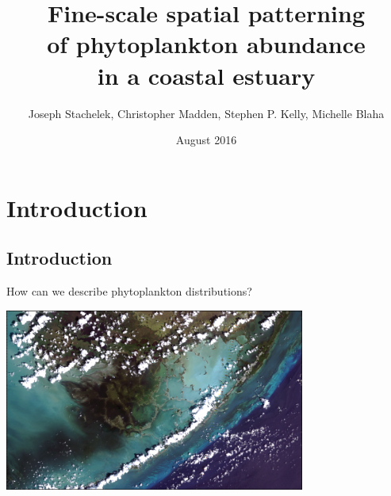 \documentclass[compress,noflama,nosectionpages]{beamer}
\title{\nohyphens{Fine-scale spatial patterning \protect\\ of phytoplankton abundance \protect\\ in a coastal estuary}}
\subtitle{\nohyphens{ }}
\date{August 2016}
\author{{\Medium Joseph Stachelek}, Christopher Madden, Stephen P. Kelly, Michelle Blaha}
\institute{{\Medium Michigan State University} South Florida Water Management District}
\begin{document}

\maketitle



\section{Introduction}
\subsection{Introduction}


\begin{frame}{How can we describe phytoplankton distributions?}

	\begin{centering}
		\includegraphics[height=6cm,keepaspectratio=true]{images/landsat_border.jpg}\\
	\end{centering}

\end{frame}
\end{document}
